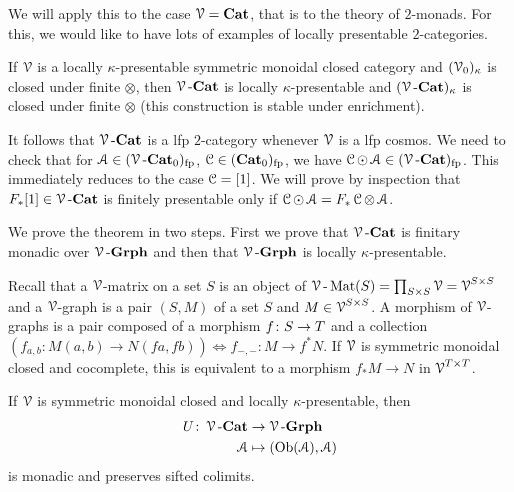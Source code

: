 \documentclass[a4paper,11pt,oneside,openany]{scrbook}
\begin{document}
We will apply this to the case $\V=\Cat$, that is to the theory of $2$-monads. For this, we would like to have lots of examples of locally presentable $2$-categories.
\begin{thm}\label{lkp}
	If $\V$ is a locally $\kappa$-presentable symmetric monoidal closed category and $(\V_0)_\kappa$ is closed under finite $\otimes$, then $\V\mbox{-}\Cat$ is locally $\kappa$-presentable and $(\V\mbox{-}\Cat)_\kappa$ is closed under finite $\otimes$ (this construction is stable under enrichment).
\end{thm}
\begin{rmk}
	It follows that $\V\mbox{-}\Cat$ is a lfp $2$-category whenever $\V$ is a lfp cosmos. We need to check that for $\A\in(\V\mbox{-}\Cat_0)_{\text{fp}}$, $\C\in(\Cat_0)_{\text{fp}}$, we have $\C\copw\A\in(\V\mbox{-}\Cat)_{\text{fp}}$. This immediately reduces to the case $\C=[1]$. We will prove by inspection that $F_*[1]\in\V\mbox{-}\Cat$ is finitely presentable only if $\C\copw\A=F_*\C\otimes\A$.
\end{rmk}
We prove the theorem in two steps. First we prove that $\V\mbox{-}\Cat$ is finitary monadic over $\V\mbox{-}\mathbf{Grph}$ and then that $\V\mbox{-}\mathbf{Grph}$ is locally $\kappa$-presentable.
\par
Recall that a $\V$-matrix on a set $S$ is an object of $\V\mbox{-}\Mat(S)=\prod_{S\times S}\V=\V^{S\times S}$ and a $\V$-graph is a pair $(S,M)$ of a set $S$ and $M\in\V^{S\times S}$. A morphism of $\V$-graphs is a pair composed of a morphism $f\from S\rightarrow T$ and a collection $(f_{a,b}\colon M(a,b)\to N(fa,fb))\iff f_{-,-}\colon M\rightarrow f^*N$. If $\V$ is symmetric monoidal closed and cocomplete, this is equivalent to a morphism $f_*M\to N$ in $\V^{T\times T}$.
\begin{thm}
	If $\V$ is symmetric monoidal closed and locally $\kappa$-presentable, then
	\begin{align*}
		U\colon\V\mbox{-}\Cat & \to\V\mbox{-}\mathbf{Grph} \\
		\A                    & \mapsto(\Ob(\A),\A)
	\end{align*}
	is monadic and preserves sifted colimits.
\end{thm}
\end{document}
